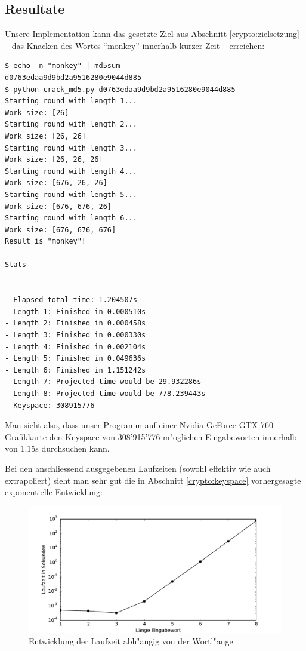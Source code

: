 \begin{refsection}
\section{Resultate}

Unsere Implementation kann das gesetzte Ziel aus Abschnitt
\ref{crypto:zielsetzung} -- das Knacken des Wortes ``monkey'' innerhalb
kurzer Zeit -- erreichen:

\begin{small}
\begin{verbatim}
$ echo -n "monkey" | md5sum
d0763edaa9d9bd2a9516280e9044d885
$ python crack_md5.py d0763edaa9d9bd2a9516280e9044d885
Starting round with length 1...
Work size: [26]
Starting round with length 2...
Work size: [26, 26]
Starting round with length 3...
Work size: [26, 26, 26]
Starting round with length 4...
Work size: [676, 26, 26]
Starting round with length 5...
Work size: [676, 676, 26]
Starting round with length 6...
Work size: [676, 676, 676]
Result is "monkey"!

Stats
-----

- Elapsed total time: 1.204507s
- Length 1: Finished in 0.000510s
- Length 2: Finished in 0.000458s
- Length 3: Finished in 0.000330s
- Length 4: Finished in 0.002104s
- Length 5: Finished in 0.049636s
- Length 6: Finished in 1.151242s
- Length 7: Projected time would be 29.932286s
- Length 8: Projected time would be 778.239443s
- Keyspace: 308915776
\end{verbatim}
\end{small}

Man sieht also, dass unser Programm auf einer Nvidia GeForce GTX 760 Grafikkarte
den Keyspace von 308'915'776 m"oglichen Eingabeworten innerhalb von 1.15s
durchsuchen kann.

Bei den anschliessend ausgegebenen Laufzeiten (sowohl effektiv wie auch
extrapoliert) sieht man sehr gut die in Abschnitt \ref{crypto:keyspace}
vorhergesagte exponentielle Entwicklung:

\begin{figure}[H]
	\centering
	\includegraphics[width=.9\textwidth]{crypto/graphs/runtime.pdf}
	\caption{Entwicklung der Laufzeit abh"angig von der Wortl"ange}
	\label{img:crypto:triplets}
\end{figure}


\end{refsection}
